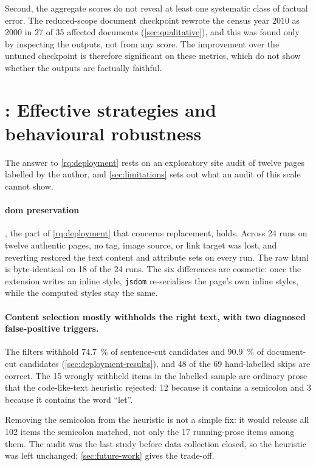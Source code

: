 Second, the aggregate scores do not reveal at least one systematic class of factual error.
The reduced-scope document checkpoint rewrote the census year 2010 as 2000 in 27 of 35 affected documents (\cref{sec:qualitative}), and this was found only by inspecting the outputs, not from any score.
The improvement over the untuned checkpoint is therefore significant on these metrics, which do not show whether the outputs are factually faithful.

\section{: Effective strategies and behavioural robustness}
\label{sec:rq2}

The answer to \cref{rq:deployment} rests on an exploratory site audit of twelve pages labelled by the author, and \cref{sec:limitations} sets out what an audit of this scale cannot show.

\paragraph{\Gls{dom} preservation}, the part of \cref{rq:deployment} that concerns replacement, holds.
Across 24 runs on twelve authentic pages, no tag, image source, or link target was lost, and reverting restored the text content and attribute sets on every run.
The raw \gls{html} is byte-identical on 18 of the 24 runs.
The six differences are cosmetic: once the extension writes an inline style, \texttt{jsdom} re-serialises the page's own inline styles, while the computed styles stay the same.

\paragraph{Content selection mostly withholds the right text, with two diagnosed false-positive triggers.}
The filters withhold \qty{74.7}{\percent} of sentence-cut candidates and \qty{90.9}{\percent} of document-cut candidates (\cref{sec:deployment-results}), and 48 of the 69 hand-labelled skips are correct.
The 15 wrongly withheld items in the labelled sample are ordinary prose that the code-like-text heuristic rejected: 12 because it contains a semicolon and 3 because it contains the word ``let''.

Removing the semicolon from the heuristic is not a simple fix: it would release all \num{102} items the semicolon matched, not only the 17 running-prose items among them.
The audit was the last study before data collection closed, so the heuristic was left unchanged; \cref{sec:future-work} gives the trade-off.

